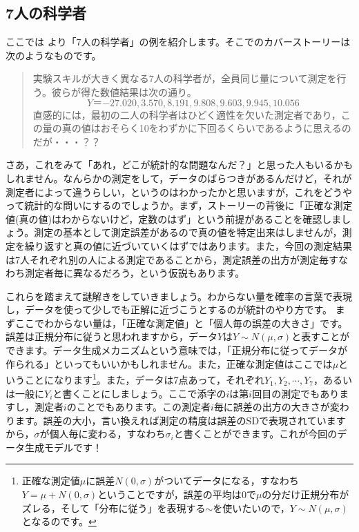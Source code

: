 \documentclass{ltjsbook}
\begin{document}
\subsection{7人の科学者}
ここでは \citet{Lee201709}より「7人の科学者」の例を紹介します。そこでのカバーストーリーは次のようなものです。

\begin{quote}
    実験スキルが大きく異なる7人の科学者が，全員同じ量について測定を行う。彼らが得た数値結果は次の通り。
    $$Y＝{-27.020,3.570,8.191,9.808,9.603,9.945,10.056}$$
    直感的には，最初の二人の科学者はひどく適性を欠いた測定者であり，この量の真の値はおそらく10をわずかに下回るくらいであるように思えるのだが・・・？？
\end{quote}

さあ，これをみて「あれ，どこが統計的な問題なんだ？」と思った人もいるかもしれません。なんらかの測定をして，データのばらつきがあるんだけど，それが測定者によって違うらしい，というのはわかったかと思いますが，これをどうやって統計的な問いにするのでしょうか。まず，ストーリーの背後に「正確な測定値(真の値)はわからないけど，定数のはず」という前提があることを確認しましょう。測定の基本として測定誤差があるので真の値を特定出来はしませんが，測定を繰り返すと真の値に近づいていくはずではあります。また，今回の測定結果は7人それぞれ別の人による測定であることから，測定誤差の出方が測定毎すなわち測定者毎に異なるだろう，という仮説もあります。

これらを踏まえて謎解きをしていきましょう。わからない量を確率の言葉で表現し，データを使って少しでも正解に近づこうとするのが統計のやり方です。
まずここでわからない量は，「正確な測定値」と「個人毎の誤差の大きさ」です。誤差は正規分布に従うと思われますから，データ$Y$は$Y\sim N(\mu, \sigma)$と表すことができます。データ生成メカニズムという意味では，「正規分布に従ってデータが作られる」といってもいいかもしれません。また，正確な測定値はここでは$\mu$ということになります\footnote{正確な測定値$\mu$に誤差$N(0,\sigma)$がついてデータになる，すなわち$Y=\mu+N(0,\sigma)$ということですが，誤差の平均は$0$で$\mu$の分だけ正規分布がズレる，そして「分布に従う」を表現する$\sim$を使いたいので，$Y\sim N(\mu,\sigma)$となるのです。}。また，データは7点あって，それぞれ$Y_1,Y_2,\cdots,Y_7$，あるいは一般に$Y_i$と書くことにしましょう。ここで添字の$i$は第$i$回目の測定でもありますし，測定者$i$のことでもあります。この測定者$i$毎に誤差の出方の大きさが変わります。誤差の大小，言い換えれば測定の精度は誤差のSDで表現されていますから，$\sigma$が個人毎に変わる，すなわち$\sigma_i$と書くことができます。これが今回のデータ生成モデルです！
\end{document}
